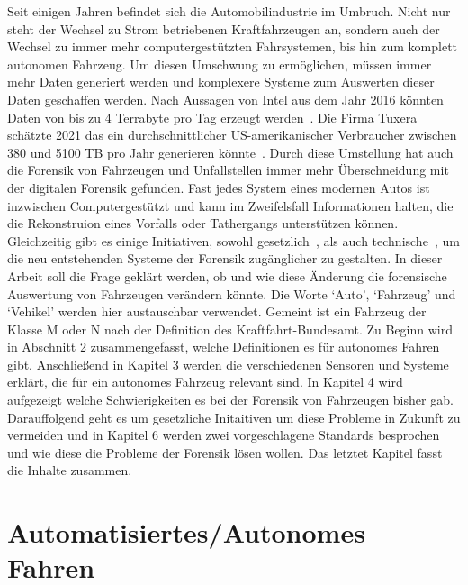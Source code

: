 \documentclass[conference,compsoc,final,a4paper]{IEEEtran}
\begin{document}
Seit einigen Jahren befindet sich die Automobilindustrie im Umbruch. Nicht nur steht der Wechsel zu Strom betriebenen Kraftfahrzeugen an,
sondern auch der Wechsel zu immer mehr computergestützten Fahrsystemen, bis hin zum komplett autonomen Fahrzeug.
Um diesen Umschwung zu ermöglichen, müssen immer mehr Daten generiert werden und komplexere Systeme zum Auswerten dieser Daten geschaffen werden.
Nach Aussagen von Intel aus dem Jahr 2016 könnten Daten von bis zu 4 Terrabyte pro Tag erzeugt werden~\cite{Nelson2016}.
Die Firma Tuxera schätzte 2021 das ein durchschnittlicher US-amerikanischer Verbraucher zwischen 380 und 5100 TB pro Jahr generieren könnte~\cite{Wright2021}.
Durch diese Umstellung hat auch die Forensik von Fahrzeugen und Unfallstellen immer mehr Überschneidung mit der digitalen Forensik gefunden.
Fast jedes System eines modernen Autos ist inzwischen Computergestützt und kann im Zweifelsfall Informationen halten, die die Rekonstruion eines Vorfalls oder Tathergangs unterstützen können.
Gleichzeitig gibt es einige Initiativen, sowohl gesetzlich~\cite{Boehm2020}, als auch technische~\cite{Hoque_2021a}\cite{Lee_2019}, um die neu entstehenden Systeme der Forensik zugänglicher zu gestalten.
In dieser Arbeit soll die Frage geklärt werden, ob und wie diese Änderung die forensische Auswertung von Fahrzeugen verändern könnte.
Die Worte `Auto', `Fahrzeug' und `Vehikel' werden hier austauschbar verwendet. Gemeint ist ein Fahrzeug der Klasse M oder N nach der Definition des Kraftfahrt-Bundesamt.
Zu Beginn wird in Abschnitt 2 zusammengefasst, welche Definitionen es für autonomes Fahren gibt. Anschließend in Kapitel 3 werden die verschiedenen
Sensoren und Systeme erklärt, die für ein autonomes Fahrzeug relevant sind.
In Kapitel 4 wird aufgezeigt welche Schwierigkeiten es bei der Forensik von Fahrzeugen bisher gab.
Darauffolgend geht es um gesetzliche Initaitiven um diese Probleme in Zukunft zu vermeiden und in Kapitel 6 werden zwei vorgeschlagene Standards
besprochen und wie diese die Probleme der Forensik lösen wollen. Das letztet Kapitel fasst die Inhalte zusammen.

\section{Automatisiertes/Autonomes Fahren}
\end{document}
